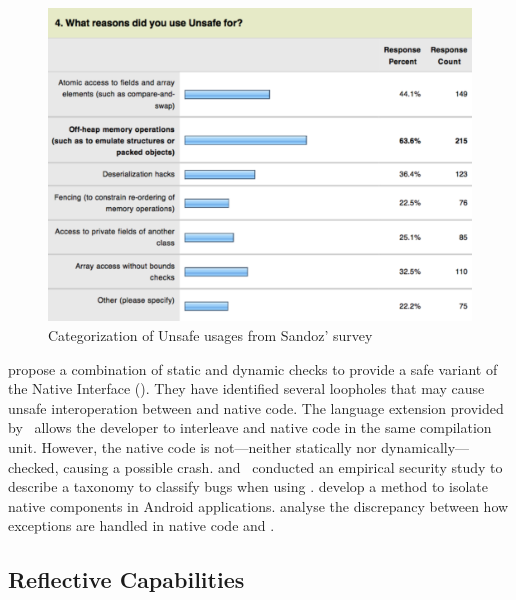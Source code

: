 \begin{figure}[ht!]
\centering
\includegraphics[width=\textwidth]{Unsafe-Survey-4}
\caption{Categorization of Unsafe usages from Sandoz' survey} \label{fig:lr:unsafe4}
\end{figure}

\cite{tanSafeJavaNative2006} propose a combination of static and dynamic checks to provide a safe variant of the \java{} Native Interface (\jni{}).
They have identified several loopholes that may cause unsafe interoperation between \java{} and native code.
The language extension provided by~\cite{Bubak00creatingjava}
allows the developer to interleave \java{} and native code in the same compilation unit.
However, the native code is not---neither statically nor dynamically---checked,
causing a possible \jvm{} crash.
\cite{tanEmpiricalSecurityStudy2008} and~\cite{kondohFindingBugsJava2008}
conducted an empirical security study to describe a taxonomy to classify bugs when using \jni{}.
\cite{sunNativeGuardProtectingAndroid2014} develop a method to isolate native components in Android applications.
\cite{liFindingBugsExceptional2009} analyse the discrepancy between how exceptions are handled in native code and \java{}.

\subsection{Reflective Capabilities}
\label{sec:literature-review:casting}

